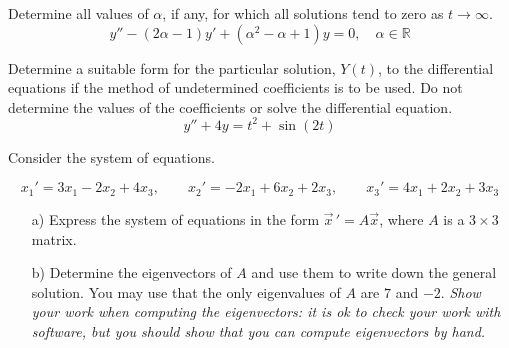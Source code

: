 \documentclass[12pt]{exam}
\begin{document}
    


\newpage


\InitialsRight

\begin{questions}
    

    \question[5] Determine all values of $\alpha$, if any, for which all solutions tend to zero as $t\to\infty$. $$y'' - (2\alpha - 1) y' + (\alpha^2-\alpha+1) y = 0, \quad \alpha \in \mathbb R$$ \vspace{10cm}  %
    
    \question[4]  Determine a suitable form for the particular solution, $Y(t)$, to the differential equations if the method of undetermined coefficients is to be used. Do not determine the values of the coefficients or solve the differential equation.
        $$y'' + 4y = t^2 + \sin(2t)$$
    
    \newpage    \InitialsLeft
    
        \question[10] Consider the system of equations. 

        $$
        x_1 ' = 3x_1 -2x_2 + 4x_3, \qquad x_2 ' = -2x_1 + 6x_2 + 2x_3 , \qquad x_3 ' = 4x_1 + 2x_2 + 3x_3 
        $$
        \begin{enumerate} 

            \item[a)] Express the system of equations in the form $\vec x \, ' = A \vec x$, where $A$ is a $3\times3$ matrix. \vspace{3cm} 

            \item[b)] Determine the eigenvectors of $A$ and use them to write down the general solution. You may use that the only eigenvalues of $A$ are $7$ and $-2$. \textit{Show your work when computing the eigenvectors: it is ok to check your work with software, but you should show that you can compute eigenvectors by hand. }
                
        \end{enumerate}
        

    \newpage \InitialsLeft
    

\end{questions}
\end{document}
